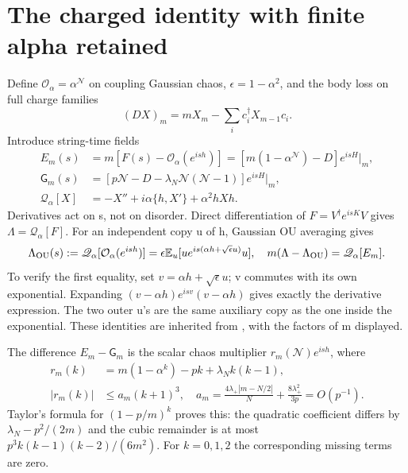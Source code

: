 \documentclass[11pt]{article}
\newcommand{\E}{\mathbb E}
\newcommand{\Nc}{\mathcal N}
\newcommand{\Qop}{\mathscr Q}
\begin{document}
\newpage
\section{The charged identity with finite alpha retained}
Define $\mathcal O_\alpha=\alpha^{\Nc}$ on coupling Gaussian chaos,
$\epsilon=1-\alpha^2$, and the body loss on full charge families
\[
 (DX)_m=mX_m-\sum_i c_i^\dagger X_{m-1}c_i.
\]
Introduce string-time fields
\begin{align*}
 E_m(s)&=m[F(s)-\mathcal O_\alpha(e^{ish})]
       =[m(1-\alpha^{\Nc})-D]e^{isH}\big|_m,\\
 \mathsf G_m(s)&=[p\Nc-D-\lambda_N\Nc(\Nc-1)]e^{isH}\big|_m,\\
 \Qop_\alpha[X]&=-X''+i\alpha\{h,X'\}+\alpha^2hXh.
\end{align*}
Derivatives act on s, not on disorder. Direct differentiation of
$F=V^\dagger e^{isK}V$ gives $\Lambda=\Qop_\alpha[F]$.
For an independent copy u of h, Gaussian OU averaging gives
\begin{equation}\label{ou-exact}
 \Lambda_{\rm OU}(s):=\Qop_\alpha[\mathcal O_\alpha(e^{ish})]
 =\epsilon\E_u[u e^{is(\alpha h+\sqrt\epsilon u)}u],\quad
 m(\Lambda-\Lambda_{\rm OU})=\Qop_\alpha[E_m].
\end{equation}
To verify the first equality, set $v=\alpha h+\sqrt\epsilon u$;
v commutes with its own exponential. Expanding
$(v-\alpha h)e^{isv}(v-\alpha h)$ gives exactly the derivative
expression. The two outer u's are the same auxiliary copy as
the one inside the exponential. These identities are inherited
from \cite{uniform,operator}, with the factors of m displayed.

The difference $E_m-\mathsf G_m$ is the scalar chaos multiplier
$r_m(\Nc)e^{ish}$, where
\begin{align}
 r_m(k)&=m(1-\alpha^k)-pk+\lambda_Nk(k-1),\nonumber\\
 |r_m(k)|&\le a_m(k+1)^3,\quad
 a_m=\frac{4\lambda_+|m-N/2|}{N}
                   +\frac{8\lambda_+^2}{3p}=O(p^{-1}).\label{number}
\end{align}
Taylor's formula for $(1-p/m)^k$ proves this: the quadratic
coefficient differs by $\lambda_N-p^2/(2m)$ and the cubic
remainder is at most $p^3k(k-1)(k-2)/(6m^2)$.
For $k=0,1,2$ the corresponding missing terms are zero.
\end{document}
